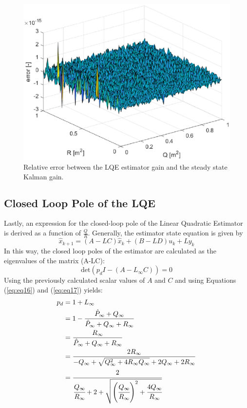 \documentclass[a4paper,kul]{kulakarticle} %
\begin{document}
\begin{figure}[htp!]
	\centering
	\includegraphics[width=.6\linewidth]{gain_error.eps}
	\caption{Relative error between the LQE estimator gain and the steady state Kalman gain.}
	\label{fig:gain_error}
\end{figure}

\subsection{Closed Loop Pole of the LQE}
\label{subsec:lqe}
Lastly, an expression for the closed-loop pole of the Linear Quadratic Estimator is derived as a function of $\frac{Q}{R}$. Generally, the estimator state equation is given by 
\begin{equation}
	\hat{x}_{k+1} = (A-LC) \hat{x}_k + (B-LD) u_k + L y_k
\end{equation}
In this way, the closed loop poles of the estimator are calculated as the eigenvalues of the matrix (A-LC):
\begin{equation}
	\text{det}(p_d I - (A-L_\infty C)) = 0
\end{equation}
Using the previously calculated scalar values of $A$ and $C$ and using Equations (\ref{eq:eq16}) and (\ref{eq:eq17}) yields:
\begin{equation}
	\begin{split}
		p_d &= 1 + L_\infty \\
		&= 1 - \frac{\hat{P}_\infty + Q_\infty}{\hat{P}_\infty + Q_\infty + R_\infty} \\
		&= \frac{R_\infty}{\hat{P}_\infty + Q_\infty + R_\infty} \\
		&= \frac{2R_\infty}{-Q_\infty + \sqrt{Q_\infty^2 + 4R_\infty Q_\infty} + 2Q_\infty + 2R_\infty} \\
		&= \cfrac{2}{\cfrac{Q_\infty}{R_\infty} + 2 + \sqrt{\left(\cfrac{Q_\infty}{R_\infty}\right)^2 + \cfrac{4Q_\infty}{R_\infty}}}
	\end{split}
\end{equation}
\end{document}
